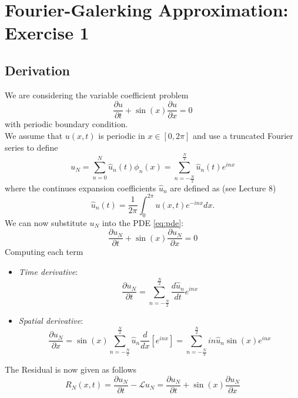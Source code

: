 \section{Fourier-Galerking Approximation: Exercise 1}
\subsection{Derivation}
We are considering the variable coefficient problem
\begin{equation}
	\frac{\partial u}{\partial t}+\sin (x) \frac{\partial u}{\partial x}=0
	\label{eq:pde}
\end{equation}
with periodic boundary condition.\\
We assume that $u(x,t)$ is periodic in $x \in [0, 2\pi]$ and use a truncated Fourier series to define
\begin{equation}
	u_N = \sum_{n=0}^N \hat{u}_n(t) \phi_n(x) = \sum_{n=-\frac{N}{2}}^{\frac{N}{2}} \hat{u}_n(t) e^{inx}
	\label{eq:un}
\end{equation}
where the continues expansion coefficients $\hat{u}_n$ are defined as (see Lecture 8)
\begin{equation}
	\hat{u}_n(t) = \frac{1}{2 \pi} \int_0^{2\pi} u(x, t) e^{-inx} dx .
	\label{eq:un_hat}
\end{equation}
We can now substitute $u_N$ into the PDE \eqref{eq:pde}:
\begin{equation}
	\frac{\partial u_N}{\partial t}+\sin (x) \frac{\partial u_N}{\partial x}=0
	\label{eq:un_pde}
\end{equation}
Computing each term
\begin{itemize}
	\item \textit{Time derivative}:
	      \begin{equation}
		      \frac{\partial u_N}{\partial t} = \sum_{n=-\frac{N}{2}}^{\frac{N}{2}} \frac{d \hat{u}_n}{dt} e^{inx}
		      \label{eq:time_der}
	      \end{equation}
	\item \textit{Spatial derivative}:
	      \begin{equation}
		      \frac{\partial u_N}{ \partial x} = \sin (x) \sum_{n=-\frac{N}{2}}^{\frac{N}{2}} \hat{u}_n \frac{d}{dx}\left [ e^{inx} \right] =  \sum_{n=-\frac{N}{2}}^{\frac{N}{2}} i n \hat{u}_n \sin(x)  e^{inx}
		      \label{eq:spat_der}
	      \end{equation}
\end{itemize}
The Residual is now given as follows
\begin{equation}
	R_N(x, t)=\frac{\partial u_N}{\partial t}-\mathcal{L} u_N = \frac{\partial u_N}{\partial t}+\sin (x) \frac{\partial u_N}{\partial x}
\end{equation}
